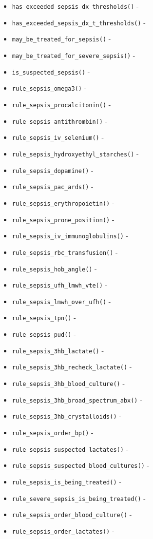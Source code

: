 \documentclass[
]{book}
\providecommand{\tightlist}{%
  \setlength{\itemsep}{0pt}\setlength{\parskip}{0pt}}
\begin{document}
\begin{itemize}
\tightlist
\item
  \texttt{has\_exceeded\_sepsis\_dx\_thresholds()} -
\item
  \texttt{has\_exceeded\_sepsis\_dx\_t\_thresholds()} -
\item
  \texttt{may\_be\_treated\_for\_sepsis()} -
\item
  \texttt{may\_be\_treated\_for\_severe\_sepsis()} -
\item
  \texttt{is\_suspected\_sepsis()} -
\item
  \texttt{rule\_sepsis\_omega3()} -
\item
  \texttt{rule\_sepsis\_procalcitonin()} -
\item
  \texttt{rule\_sepsis\_antithrombin()} -
\item
  \texttt{rule\_sepsis\_iv\_selenium()} -
\item
  \texttt{rule\_sepsis\_hydroxyethyl\_starches()} -
\item
  \texttt{rule\_sepsis\_dopamine()} -
\item
  \texttt{rule\_sepsis\_pac\_ards()} -
\item
  \texttt{rule\_sepsis\_erythropoietin()} -
\item
  \texttt{rule\_sepsis\_prone\_position()} -
\item
  \texttt{rule\_sepsis\_iv\_immunoglobulins()} -
\item
  \texttt{rule\_sepsis\_rbc\_transfusion()} -
\item
  \texttt{rule\_sepsis\_hob\_angle()} -
\item
  \texttt{rule\_sepsis\_ufh\_lmwh\_vte()} -
\item
  \texttt{rule\_sepsis\_lmwh\_over\_ufh()} -
\item
  \texttt{rule\_sepsis\_tpn()} -
\item
  \texttt{rule\_sepsis\_pud()} -
\item
  \texttt{rule\_sepsis\_3hb\_lactate()} -
\item
  \texttt{rule\_sepsis\_3hb\_recheck\_lactate()} -
\item
  \texttt{rule\_sepsis\_3hb\_blood\_culture()} -
\item
  \texttt{rule\_sepsis\_3hb\_broad\_spectrum\_abx()} -
\item
  \texttt{rule\_sepsis\_3hb\_crystalloids()} -
\item
  \texttt{rule\_sepsis\_order\_bp()} -
\item
  \texttt{rule\_sepsis\_suspected\_lactates()} -
\item
  \texttt{rule\_sepsis\_suspected\_blood\_cultures()} -
\item
  \texttt{rule\_sepsis\_is\_being\_treated()} -
\item
  \texttt{rule\_severe\_sepsis\_is\_being\_treated()} -
\item
  \texttt{rule\_sepsis\_order\_blood\_culture()} -
\item
  \texttt{rule\_sepsis\_order\_lactates()} -
\end{itemize}
\end{document}
